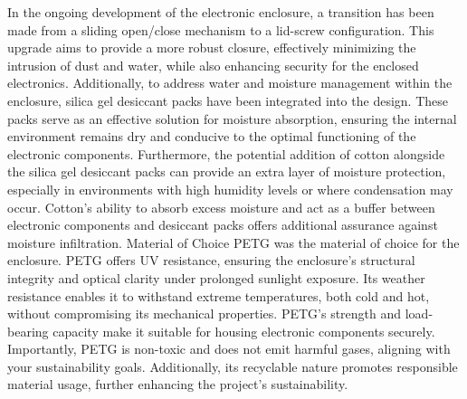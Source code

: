 In the ongoing development of the electronic enclosure, a transition has been made from a sliding open/close mechanism to a lid-screw configuration. This upgrade aims to provide a more robust closure, effectively minimizing the intrusion of dust and water, while also enhancing security for the enclosed electronics.
Additionally, to address water and moisture management within the enclosure, silica gel desiccant packs have been integrated into the design. These packs serve as an effective solution for moisture absorption, ensuring the internal environment remains dry and conducive to the optimal functioning of the electronic components. Furthermore, the potential addition of cotton alongside the silica gel desiccant packs can provide an extra layer of moisture protection, especially in environments with high humidity levels or where condensation may occur. Cotton's ability to absorb excess moisture and act as a buffer between electronic components and desiccant packs offers additional assurance against moisture infiltration.
Material of Choice
PETG was the material of choice for the enclosure. PETG offers UV resistance, ensuring the enclosure's structural integrity and optical clarity under prolonged sunlight exposure. Its weather resistance enables it to withstand extreme temperatures, both cold and hot, without compromising its mechanical properties. PETG's strength and load-bearing capacity make it suitable for housing electronic components securely. Importantly, PETG is non-toxic and does not emit harmful gases, aligning with your sustainability goals. Additionally, its recyclable nature promotes responsible material usage, further enhancing the project's sustainability. 

